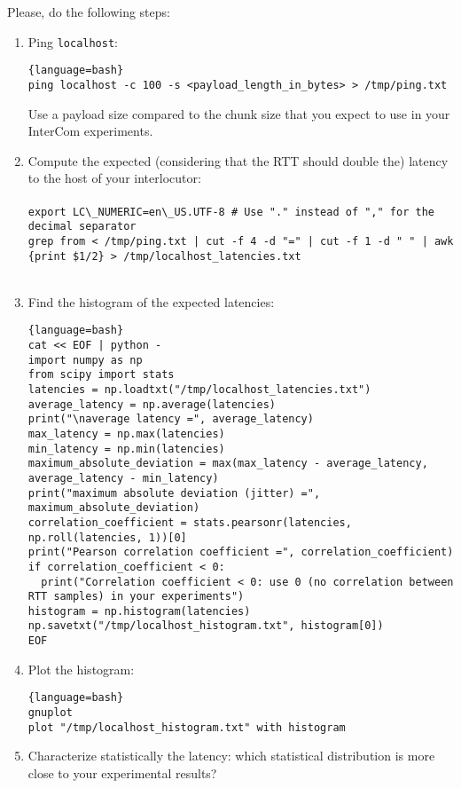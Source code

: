 Please, do the following steps:

\begin{enumerate}
\item Ping \verb|localhost|:
   \begin{lstlisting}{language=bash}
ping localhost -c 100 -s <payload_length_in_bytes> > /tmp/ping.txt
  \end{lstlisting}
  Use a payload size compared to the chunk size that you expect to use
  in your InterCom experiments.
\item Compute the expected (considering that the RTT should
  double the) latency to the host of your interlocutor:\\\\
  \verb|export LC\_NUMERIC=en\_US.UTF-8 # Use "." instead of "," for the decimal separator|\\
\texttt{grep from < /tmp/ping.txt | cut -f 4 -d "=" | cut -f 1 -d " " | awk
  \textquotesingle\{print \$1/2\}\textquotesingle~> /tmp/localhost\_latencies.txt}\\\\

\item Find the histogram of the expected latencies:
  
  \begin{lstlisting}{language=bash}
cat << EOF | python -
import numpy as np
from scipy import stats
latencies = np.loadtxt("/tmp/localhost_latencies.txt")
average_latency = np.average(latencies)
print("\naverage latency =", average_latency)
max_latency = np.max(latencies)
min_latency = np.min(latencies)
maximum_absolute_deviation = max(max_latency - average_latency, average_latency - min_latency)
print("maximum absolute deviation (jitter) =", maximum_absolute_deviation)
correlation_coefficient = stats.pearsonr(latencies, np.roll(latencies, 1))[0]
print("Pearson correlation coefficient =", correlation_coefficient)
if correlation_coefficient < 0:
  print("Correlation coefficient < 0: use 0 (no correlation between RTT samples) in your experiments")
histogram = np.histogram(latencies)
np.savetxt("/tmp/localhost_histogram.txt", histogram[0])
EOF
  \end{lstlisting}

\item Plot the histogram:
  \begin{lstlisting}{language=bash}
gnuplot
plot "/tmp/localhost_histogram.txt" with histogram
  \end{lstlisting}
  
\item Characterize statistically the latency: which statistical
  distribution is more close to your experimental results?
\end{enumerate}


